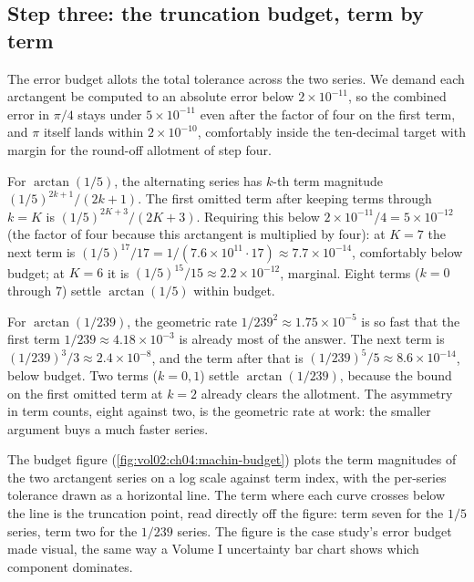 \subsection{Step three: the truncation budget, term by term}

The error budget allots the total tolerance across the two series. We
demand each arctangent be computed to an absolute error below $2 \times
10^{-11}$, so the combined error in $\pi/4$ stays under $5 \times
10^{-11}$ even after the factor of four on the first term, and $\pi$
itself lands within $2 \times 10^{-10}$, comfortably inside the
ten-decimal target with margin for the round-off allotment of step four.

For $\arctan(1/5)$, the alternating series has $k$-th term magnitude
$(1/5)^{2k+1}/(2k+1)$. The first omitted term after keeping terms
through $k = K$ is $(1/5)^{2K+3}/(2K+3)$. Requiring this below $2 \times
10^{-11}/4 = 5 \times 10^{-12}$ (the factor of four because this
arctangent is multiplied by four): at $K = 7$ the next term is
$(1/5)^{17}/17 = 1/(7.6 \times 10^{11} \cdot 17) \approx 7.7 \times
10^{-14}$, comfortably below budget; at $K = 6$ it is $(1/5)^{15}/15
\approx 2.2 \times 10^{-12}$, marginal. Eight terms ($k = 0$ through
$7$) settle $\arctan(1/5)$ within budget.

For $\arctan(1/239)$, the geometric rate $1/239^{2} \approx 1.75 \times
10^{-5}$ is so fast that the first term $1/239 \approx 4.18 \times
10^{-3}$ is already most of the answer. The next term is
$(1/239)^{3}/3 \approx 2.4 \times 10^{-8}$, and the term after that is
$(1/239)^{5}/5 \approx 8.6 \times 10^{-14}$, below budget. Two terms
($k = 0, 1$) settle $\arctan(1/239)$, because the bound on the first
omitted term at $k = 2$ already clears the allotment. The asymmetry in
term counts, eight against two, is the geometric rate at work: the
smaller argument buys a much faster series.



The budget figure (\autoref{fig:vol02:ch04:machin-budget}) plots the
term magnitudes of the two arctangent series on a log scale against term
index, with the per-series tolerance drawn as a horizontal line. The
term where each curve crosses below the line is the truncation point,
read directly off the figure: term seven for the $1/5$ series, term two
for the $1/239$ series. The figure is the case study's error budget made
visual, the same way a Volume I uncertainty bar chart shows which
component dominates.

